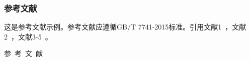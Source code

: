 
\subsubsection{参考文献}
这是参考文献示例。参考文献应遵循GB/T 7741-2015标准。引用文献1~\cite{Bohan1928}，文献2~\cite{chen1980zhongguo}，文献3-5~\cite{bravo1990comparative,niu2013zonghe,yuan2012lana}。

\vspace {3mm}

\vspace {5mm}
\centerline
{\textsf{参~考~文~献}}
 \addtolength{\itemsep}{-1em}
\vspace {1.5mm}

